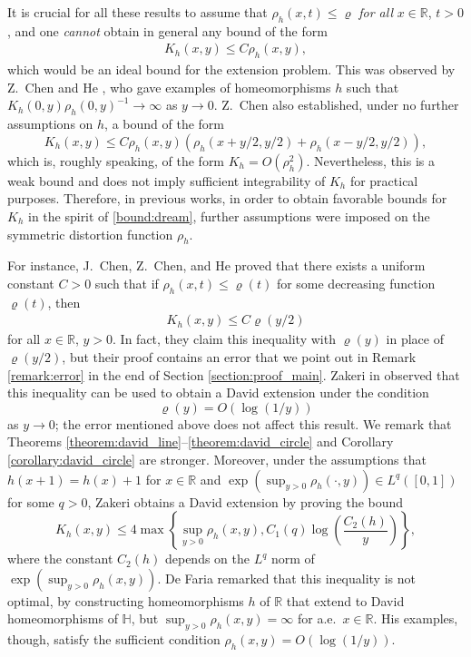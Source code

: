 \documentclass{amsart}
\theoremstyle{plain}
\theoremstyle{definition}
\theoremstyle{remark}
\numberwithin{equation}{section}
\numberwithin{theorem}{section}
\numberwithin{conjecture}{section}
\newcommand{\R}{\mathbb R}
\newcommand{\1}{\mathbf 1}
\newcommand{\UHP}{\mathbb H}
\begin{document}
It is crucial for all these results to assume that $\rho_h(x,t) \leq \varrho$ \textit{for all} $x\in \R$, $t>0$, and one \textit{cannot} obtain in general any bound of the form 
\begin{align}\label{bound:dream}
K_h(x,y)\leq C \rho_h(x,y),
\end{align}
which would be an ideal bound for the extension problem. This was observed by Z.\ Chen and He \cite{Chen:BeurlingAhlfors,ChenHe:BeurlingAhlfors}, who gave examples of homeomorphisms $h$ such that $K_h(0,y)\rho_h(0,y)^{-1} \to\infty$ as $y\to0$. Z.\ Chen \cite{Chen:BeurlingAhlfors} also established, under no further assumptions on $h$, a bound of the form 
$$K_h(x,y)\leq C\rho_h(x,y)( \rho_h(x+y/2,y/2)+\rho_h(x-y/2,y/2) ),$$
which is, roughly speaking, of the form  $K_h=O(\rho_h^2)$. Nevertheless, this is a weak bound and does not imply sufficient integrability of $K_h$ for practical purposes. Therefore, in previous works, in order to obtain favorable bounds for $K_h$ in the spirit of \eqref{bound:dream}, further assumptions were imposed on the symmetric distortion function $\rho_h$. 

For instance, J.\ Chen, Z.\ Chen, and He \cite{ChenChenHe:boundary} proved that there exists a uniform constant $C>0$ such that if $\rho_h(x,t) \leq \varrho(t)$ for some decreasing function $\varrho(t)$, then 
\begin{align*}
K_h(x,y)\leq C \varrho(y/2)
\end{align*}
for all $x\in \R$, $y>0$. In fact, they claim this inequality with $\varrho(y)$ in place of $\varrho(y/2)$, but their proof contains an error that we point out in Remark \ref{remark:error} in the end of Section \ref{section:proof_main}. Zakeri in \cite{Zakeri:boundary} observed that this inequality can be used to obtain a David extension under the condition 
$$\varrho(y)= O(\log(1/y))$$
as $y\to 0$; the error mentioned above does not affect this result. We remark that Theorems \ref{theorem:david_line}--\ref{theorem:david_circle} and Corollary \ref{corollary:david_circle} are stronger.  Moreover, under the assumptions that $h(x+1)=h(x)+1$ for $x\in \R$ and $\exp(\sup_{y>0} \rho_h(\cdot ,y))\in L^q([0,1])$ for some $q>0$, Zakeri obtains a David extension by proving the bound
$$K_h(x,y)\leq 4 \max\left \{\sup_{y>0} \rho_h(x,y),  C_1(q)\log\left(\frac{C_2(h)}{y}\right)\right\},$$
where the constant $C_2(h)$ depends on the $L^q$ norm of $\exp(\sup_{y>0} \rho_h(x,y))$. De Faria \cite{deFaria:David} remarked that this inequality is not optimal, by constructing homeomorphisms $h$ of $\R$ that extend to David homeomorphisms of $\UHP$, but $\sup_{y>0} \rho_h(x,y) =\infty$ for a.e.\ $x\in \R$. His examples, though, satisfy the sufficient condition $\rho_h(x,y)= O(\log(1/y))$.
\end{document}
